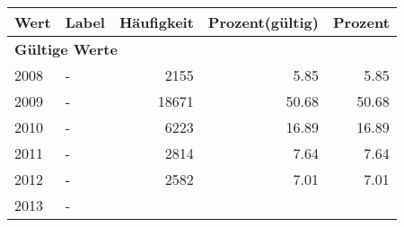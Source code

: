      \begin{longtable}{lXrrr}
     \toprule
     \textbf{Wert} & \textbf{Label} & \textbf{Häufigkeit} & \textbf{Prozent(gültig)} & \textbf{Prozent} \\
     \endhead
     \midrule
     \multicolumn{5}{l}{\textbf{Gültige Werte}}\\

     2008 &
     \multicolumn{1}{X}{ -  } &


       \num{2155} &
       \num[round-mode=places,round-precision=2]{5,85} &
         \num[round-mode=places,round-precision=2]{5,85} \\

     2009 &
     \multicolumn{1}{X}{ -  } &


       \num{18671} &
       \num[round-mode=places,round-precision=2]{50,68} &
         \num[round-mode=places,round-precision=2]{50,68} \\

     2010 &
     \multicolumn{1}{X}{ -  } &


       \num{6223} &
       \num[round-mode=places,round-precision=2]{16,89} &
         \num[round-mode=places,round-precision=2]{16,89} \\

     2011 &
     \multicolumn{1}{X}{ -  } &


       \num{2814} &
       \num[round-mode=places,round-precision=2]{7,64} &
         \num[round-mode=places,round-precision=2]{7,64} \\

     2012 &
     \multicolumn{1}{X}{ -  } &


       \num{2582} &
       \num[round-mode=places,round-precision=2]{7,01} &
         \num[round-mode=places,round-precision=2]{7,01} \\

     2013 &
     \multicolumn{1}{X}{ -  } &



\end{longtable}

